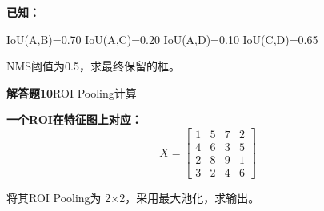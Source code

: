 \documentclass[UTF8,openany,oneside,zihao=-4,fontset=windows]{ctexbook}
\newif\ifshowsolutions
\newcommand{\Question}[2]{%
  \par\Needspace{4\baselineskip}\medskip
  \noindent\textbf{\color{MVBlue}#1}\quad #2\par
}
\newenvironment{AnswerBox}{\begin{tcolorbox}[breakable,colback=MVLight,colframe=MVBlue!45,title={参考答案},fonttitle=\bfseries,boxrule=0.55pt,arc=1.5mm,left=2mm,right=2mm,top=1.5mm,bottom=1.5mm]}{\end{tcolorbox}}
\newcommand{\PracticeSpace}[1]{\ifshowsolutions\else\par\vspace{#1}\par\fi}
\begin{document}
\par\noindent\textbf{已知：}
\begin{center}\small\ttfamily IoU(A,B)=0.70 IoU(A,C)=0.20 IoU(A,D)=0.10 IoU(C,D)=0.65\end{center}
\par NMS阈值为0.5，求最终保留的框。
\ifshowsolutions
\begin{AnswerBox}
\par 首先选择置信度最高的A并保留。
\par\noindent\textbf{B与A的IoU为：}
\par 0.70>0.5
\par 所以删除B。
\par\noindent\textbf{C与A的IoU为：}
\par 0.20<0.5
\par 保留候选资格。
\par\noindent\textbf{D与A的IoU为：}
\par 0.10<0.5
\par 也暂时保留。
\par 接下来选择剩余框中置信度最高的C并保留。
\par\noindent\textbf{D与C的IoU为：}
\par 0.65>0.5
\par 因此删除D。
\par\noindent\textbf{最终保留：}
\par A、C
\end{AnswerBox}
\else
\PracticeSpace{4.2cm}
\fi
\Question{解答题10}{ROI Pooling计算}
\par\noindent\textbf{一个ROI在特征图上对应：}
\[
X = \begin{bmatrix}
1 & 5 & 7 & 2 \\
4 & 6 & 3 & 5 \\
2 & 8 & 9 & 1 \\
3 & 2 & 4 & 6
\end{bmatrix}
\]
\par 将其ROI Pooling为 2×2，采用最大池化，求输出。
\ifshowsolutions
\end{document}
